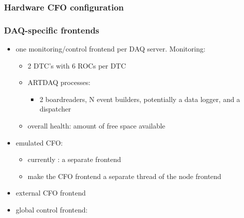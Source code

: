 \newpage
\subsubsection{Hardware CFO configuration}


% 

\subsubsection{DAQ-specific frontends}

\begin{itemize}
\item
  one monitoring/control frontend per DAQ server. Monitoring:
  \begin{itemize}
  \item
    2 DTC's with 6 ROCs per DTC
  \item
    ARTDAQ processes:
    \begin{itemize}
    \item
      2 boardreaders, N event builders, potentially a data logger, and a dispatcher
    \end{itemize}
  \item
    overall health: amount of free space available
  \end{itemize}
\item
  emulated CFO:
  \begin{itemize}
  \item
    currently : a separate frontend 
  \item 
    make the CFO frontend a separate thread of the node frontend
  \end{itemize}
\item
  external CFO frontend 
\item
  global control frontend:
\end{itemize}

